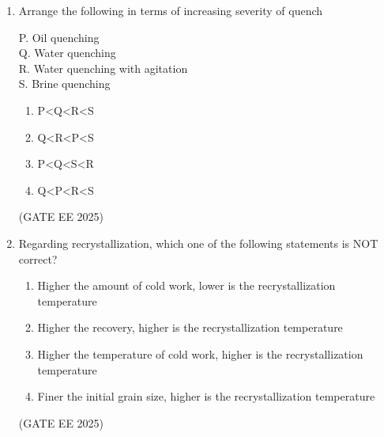 \documentclass[11pt, letterpaper]{article}
\theoremstyle{remark}
\begin{document}
\begin{enumerate}
\begin{multicols}{2}
\underline{Group 2}
\begin{enumerate}[label=(\arabic*), start=1]
\item bcc 
\item fcc
\item bct
\item Orthorhombic
\end{enumerate}
\end{multicols}

\begin{multicols}{2}
\begin{enumerate}  
\item P-3, Q-4, R-1, S-2
\item P-2, Q-3, R-1, S-4
\item P-3, Q-4, R-2, S-1
\item P-4, Q-3, R-2, S-1
\end{enumerate}
\end{multicols}
\hfill(GATE EE 2025)

\item Arrange the following in terms of increasing severity of quench

P. Oil quenching \\
Q. Water quenching \\
R. Water quenching with agitation \\
S. Brine quenching

\begin{multicols}{2}
\begin{enumerate}  
\item P<Q<R<S
\item Q<R<P<S
\item P<Q<S<R
\item Q<P<R<S
\end{enumerate}
\end{multicols}
\hfill(GATE EE 2025)

\item Regarding recrystallization, which one of the following statements is NOT correct?

\begin{enumerate}  
\item Higher the amount of cold work, lower is the recrystallization temperature
\item Higher the recovery, higher is the recrystallization temperature
\item Higher the temperature of cold work, higher is the recrystallization temperature
\item Finer the initial grain size, higher is the recrystallization temperature
\end{enumerate}
\hfill(GATE EE 2025)


\end{enumerate}
\end{document}
